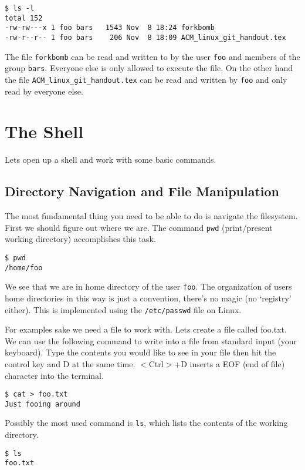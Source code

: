 \documentclass[10pt]{article}
\begin{document}
\begin{verbatim}
$ ls -l
total 152
-rw-rw---x 1 foo bars   1543 Nov  8 18:24 forkbomb
-rw-r--r-- 1 foo bars    206 Nov  8 18:09 ACM_linux_git_handout.tex
\end{verbatim}

  The file \texttt{forkbomb} can be read and written to by the user \texttt{foo} and members of the group \texttt{bars}. Everyone else is only allowed to execute the file. On the other hand the file \texttt{ACM\_linux\_git\_handout.tex} can be read and written by \texttt{foo} and only read by everyone else.
  
  
\section{The Shell}
Lets open up a shell and work with some basic commands.
  \subsection{Directory Navigation and File Manipulation}
  The most fundamental thing you need to be able to do is navigate the filesystem.
  First we should figure out where we are. 
  The command \texttt{pwd} (print/present working directory) accomplishes this task.

\begin{verbatim}
$ pwd
/home/foo
\end{verbatim}

  We see that we are in home directory of the user \texttt{foo}. The organization
  of users home directories in this way is just a convention, there's no magic (no `registry' either). 
  This is implemented using the \texttt{/etc/passwd} file on Linux. 

  For examples sake we need a file to work with. Lets create a file called foo.txt. We can use the following command to write into a file from standard input (your keyboard). Type the contents you would like to see in your file then hit the control key and D at the same time. $<$Ctrl$>$+D inserts a EOF (end of file) character into the terminal.

\begin{verbatim}
$ cat > foo.txt 
Just fooing around
\end{verbatim}

  Possibly the most used command is \texttt{ls}, which lists the contents of the working directory.
  
\begin{verbatim}
$ ls
foo.txt
\end{verbatim}
  
\end{document}
